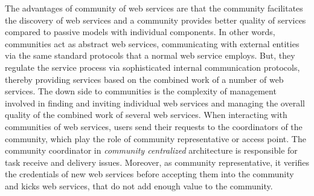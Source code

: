 \documentclass[10pt,journal,cspaper,compsoc]{IEEEtran}
\begin{document}
The advantages of community of web services are that the community facilitates the discovery of web services and a community provides better quality of services compared to passive models with individual components. In other words, communities act as abstract web services, communicating with external entities via the same standard protocols that a normal web service employs. But, they regulate the service process via sophisticated internal communication protocols, thereby providing services based on the combined work of a number of web services. The down side to communities is the complexity of management involved in finding and inviting individual web services and managing the overall quality of the combined work of several web services.
When interacting with communities of web services, users send their requests to the coordinators of the community, which play the role of community representative or access point. The community coordinator in \emph{community centralized} architecture is responsible for task receive and delivery issues. Moreover, as community representative, it verifies the credentials of new web services before accepting them into the community and kicks web services, that do not add enough value to the community.  
\end{document}
